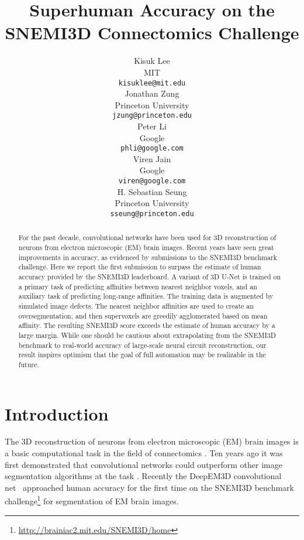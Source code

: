 \documentclass{article}
\title{Superhuman Accuracy on the SNEMI3D Connectomics Challenge}
\author{
  Kisuk Lee \\
  MIT \\
  \texttt{kisuklee@mit.edu} \\
  \And
  Jonathan Zung \\
  Princeton University \\
  \texttt{jzung@princeton.edu} \\
  \And
  Peter Li\\
  Google\\
  \texttt{phli@google.com}\\
  \And
  Viren Jain\\
  Google\\
  \texttt{viren@google.com}\\
  \And
  H. Sebastian Seung \\
  Princeton University \\
  \texttt{sseung@princeton.edu} \\
}
\begin{document}

\maketitle

\begin{abstract}

For the past decade, convolutional networks have been used for 3D reconstruction
of neurons from electron microscopic (EM) brain images. Recent years have seen
great improvements in accuracy, as evidenced by submissions to the SNEMI3D
benchmark challenge.  Here we report the first submission to surpass the
estimate of human accuracy provided by the SNEMI3D leaderboard.  A variant of 3D
U-Net is trained on a primary task of predicting affinities between nearest
neighbor voxels, and an auxiliary task of predicting long-range affinities. The
training data is augmented by simulated image defects. The nearest neighbor
affinities are used to create an oversegmentation, and then supervoxels are
greedily agglomerated based on mean affinity.  The resulting SNEMI3D score
exceeds the estimate of human accuracy by a large margin.  While one should be
cautious about extrapolating from the SNEMI3D benchmark to real-world accuracy
of large-scale neural circuit reconstruction, our result inspires optimism
that the goal of full automation may be realizable in the future.

\end{abstract}

\section{Introduction}
\label{intro}

The 3D reconstruction of neurons from electron microscopic (EM) brain images is
a basic computational task in the field of connectomics \cite{plaza2014toward}.
Ten years ago it was first demonstrated that convolutional networks could
outperform other image segmentation algorithms at the task
\cite{jain2007supervised}. Recently the DeepEM3D convolutional
net~\cite{zeng2017} approached human accuracy for the first time on the SNEMI3D
benchmark challenge\footnote{\url{http://brainiac2.mit.edu/SNEMI3D/home}} for
segmentation of EM brain images.
\end{document}
